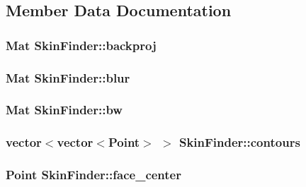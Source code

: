 \subsection{Member Data Documentation}
\hypertarget{class_skin_finder_aed495dc76d3c5f96eb97805d49923e59}{
\subsubsection[{backproj}]{\setlength{\rightskip}{0pt plus 5cm}Mat {\bf SkinFinder::backproj}}}
\label{class_skin_finder_aed495dc76d3c5f96eb97805d49923e59}
\hypertarget{class_skin_finder_abc551e869a5beddbc7d4c956653d414e}{
\subsubsection[{blur}]{\setlength{\rightskip}{0pt plus 5cm}Mat {\bf SkinFinder::blur}}}
\label{class_skin_finder_abc551e869a5beddbc7d4c956653d414e}
\hypertarget{class_skin_finder_a325d75cde01cb02243af4dee842f6512}{
\subsubsection[{bw}]{\setlength{\rightskip}{0pt plus 5cm}Mat {\bf SkinFinder::bw}}}
\label{class_skin_finder_a325d75cde01cb02243af4dee842f6512}
\hypertarget{class_skin_finder_a6921f1002639c7a369f637b229de376a}{
\subsubsection[{contours}]{\setlength{\rightskip}{0pt plus 5cm}vector$<$vector$<$Point$>$ $>$ {\bf SkinFinder::contours}}}
\label{class_skin_finder_a6921f1002639c7a369f637b229de376a}
\hypertarget{class_skin_finder_a55330ad48d6c72f9a0f9d16a874b39ce}{
\subsubsection[{face\_\-center}]{\setlength{\rightskip}{0pt plus 5cm}Point {\bf SkinFinder::face\_\-center}}}
\label{class_skin_finder_a55330ad48d6c72f9a0f9d16a874b39ce}
